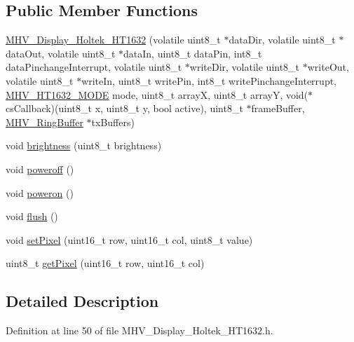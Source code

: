 \subsection*{\-Public \-Member \-Functions}
\begin{DoxyCompactItemize}
\item 
\hyperlink{class_m_h_v___display___holtek___h_t1632_a60d764947891119adbee7951a72c5ffc}{\-M\-H\-V\-\_\-\-Display\-\_\-\-Holtek\-\_\-\-H\-T1632} (volatile uint8\-\_\-t $\ast$data\-Dir, volatile uint8\-\_\-t $\ast$data\-Out, volatile uint8\-\_\-t $\ast$data\-In, uint8\-\_\-t data\-Pin, int8\-\_\-t data\-Pinchange\-Interrupt, volatile uint8\-\_\-t $\ast$write\-Dir, volatile uint8\-\_\-t $\ast$write\-Out, volatile uint8\-\_\-t $\ast$write\-In, uint8\-\_\-t write\-Pin, int8\-\_\-t write\-Pinchange\-Interrupt, \hyperlink{_m_h_v___display___holtek___h_t1632_8h_a49097ad6362d784be39f7e83f5359011}{\-M\-H\-V\-\_\-\-H\-T1632\-\_\-\-M\-O\-D\-E} mode, uint8\-\_\-t array\-X, uint8\-\_\-t array\-Y, void($\ast$cs\-Callback)(uint8\-\_\-t x, uint8\-\_\-t y, bool active), uint8\-\_\-t $\ast$frame\-Buffer, \hyperlink{class_m_h_v___ring_buffer}{\-M\-H\-V\-\_\-\-Ring\-Buffer} $\ast$tx\-Buffers)
\item 
void \hyperlink{class_m_h_v___display___holtek___h_t1632_a60620705276f1713dead13a4b440fed4}{brightness} (uint8\-\_\-t brightness)
\item 
void \hyperlink{class_m_h_v___display___holtek___h_t1632_a224e7f735441e8d381fb6148f2b64dda}{poweroff} ()
\item 
void \hyperlink{class_m_h_v___display___holtek___h_t1632_a2a9586d4c16483b4223a2fad453bc6bf}{poweron} ()
\item 
void \hyperlink{class_m_h_v___display___holtek___h_t1632_aeeb460d8c5ba0d8d43fb18779e50258e}{flush} ()
\item 
void \hyperlink{class_m_h_v___display___holtek___h_t1632_a664e9a5744bed3fa50a6adc9fcf80206}{set\-Pixel} (uint16\-\_\-t row, uint16\-\_\-t col, uint8\-\_\-t value)
\item 
uint8\-\_\-t \hyperlink{class_m_h_v___display___holtek___h_t1632_a32fe510b3bfa55a32e02a9570e67639d}{get\-Pixel} (uint16\-\_\-t row, uint16\-\_\-t col)
\end{DoxyCompactItemize}


\subsection{\-Detailed \-Description}


\-Definition at line 50 of file \-M\-H\-V\-\_\-\-Display\-\_\-\-Holtek\-\_\-\-H\-T1632.\-h.



